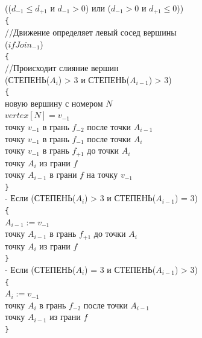 \documentclass[a4paper,12pt, titlepage]{article}
\begin{document}
\begin{flushleft}
 (($d_{-1} \le d_{+1}$ и $d_{-1} > 0$) или ($d_{-1} > 0$ и $d_{+1} \le 0$))\\
\quad\verb"{"\\
\quad\quad//Движение определяет левый сосед вершины\\
\quad{}($ifJoin_{-1}$)\\
\quad\quad\verb"{"\\
\quad\quad\quad//Происходит слияние вершин\\

\quad\quad{} (СТЕПЕНЬ($A_{i}$) > 3 и СТЕПЕНЬ($A_{i - 1}$) > 3)\\
\quad\quad\quad\verb"{"\\
\quad\quad\quad{} новую вершину с номером $N$\\
\quad\quad\quad\quad$vertex[N] = v_{-1}$\\
\quad\quad\quad{} точку $v_{-1}$ в грань $f_{-2}$ после точки $A_{i - 1}$\\
\quad\quad\quad{} точку $v_{-1}$ в грань $f_{-1}$ после точки $A_{i}$\\
\quad\quad\quad{} точку $v_{-1}$ в грань $f_{+1}$ до точки $A_{i}$\\
\quad\quad\quad{} точку $A_{i}$ из грани $f$\\
\quad\quad\quad{} точку $A_{i - 1}$ в грани $f$ на точку $v_{-1}$\\
\quad\quad\quad\verb"}"\\

\quad\quad{} - Если (СТЕПЕНЬ($A_{i}$) > 3 и СТЕПЕНЬ($A_{i - 1}$) = 3)\\
\quad\quad\quad\verb"{"\\
\quad\quad\quad\quad$A_{i - 1} := v_{-1}$\\
\quad\quad\quad{} точку $A_{i - 1}$ в грань $f_{+1}$ до точки $A_{i}$\\
\quad\quad\quad{} точку $A_{i}$ из грани $f$\\
\quad\quad\quad\verb"}"\\

\quad\quad{} - Если (СТЕПЕНЬ($A_{i}$) = 3 и СТЕПЕНЬ($A_{i - 1}$) > 3)\\
\quad\quad\quad\verb"{"\\
\quad\quad\quad\quad$A_{i} := v_{-1}$\\
\quad\quad\quad{} точку $A_{i}$ в грань $f_{-2}$ после точки $A_{i - 1}$\\
\quad\quad\quad{} точку $A_{i - 1}$ из грани $f$\\
\quad\quad\quad\verb"}"\\


\end{flushleft}
\end{document}
